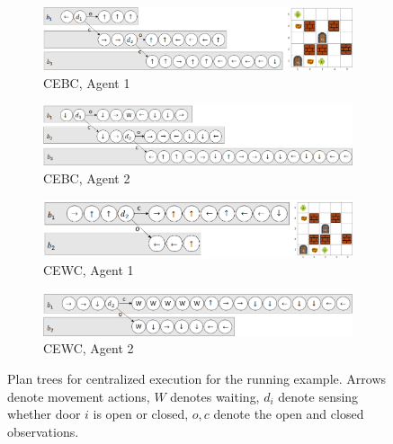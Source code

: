 \documentclass[letterpaper]{article} %
\begin{document}
\begin{figure}[t]
    \begin{subfigure}[b]{0.4\textwidth}
      \includegraphics[scale=.25]{Figures/CEBC1+example.png}
      \caption{CEBC, Agent 1}\label{fig:CEBC1}
    \end{subfigure}
    \begin{subfigure}[b]{0.4\textwidth}
      \includegraphics[scale=.25]{Figures/CEBC2.png}
      \caption{CEBC, Agent 2}\label{fig:CEBC2}    
    \end{subfigure}
    
    \begin{subfigure}[b]{0.4\textwidth}
      \includegraphics[scale=.25]{Figures/CEWC1+example.png}
      \caption{CEWC, Agent 1}\label{fig:CEWC1}
    \end{subfigure}
    \begin{subfigure}[b]{0.4\textwidth}
      \includegraphics[scale=.25]{Figures/CEWC2.png}
      \caption{CEWC, Agent 2}\label{fig:CEWC2}
    \end{subfigure}
    \caption{Plan trees for centralized execution for the running example. Arrows denote movement actions, $W$ denotes waiting, $d_i$ denote sensing whether door $i$ is open or closed, $o,c$ denote the open and closed observations.}
    
\end{figure}
\end{document}
